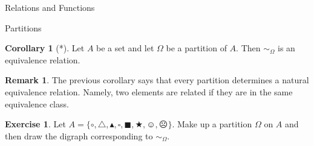 \documentclass[11pt]{article}
\theoremstyle{definition}
\newtheorem{corollary}[theorem]{Corollary}
\newtheorem{exercise}[theorem]{Exercise}
\newtheorem{remark}[theorem]{Remark}
\begin{document}
\begin{section}{Relations and Functions}
\begin{subsection}{Partitions}
\begin{corollary}[*]
Let $A$ be a set and let $\Omega$ be a partition of $A$.  Then $\sim_{\Omega}$ is an equivalence relation.
\end{corollary}

\begin{remark}
The previous corollary says that every partition determines a natural equivalence relation.  Namely, two elements are related if they are in the same equivalence class.
\end{remark}

\begin{exercise}
Let $A=\{\circ, \triangle, \blacktriangle, \square, \blacksquare, \bigstar, \smiley, \frownie\}$.  Make up a partition $\Omega$ on $A$ and then draw the digraph corresponding to $\sim_{\Omega}$.
\end{exercise}

\end{subsection}

\end{section}
\end{document}
